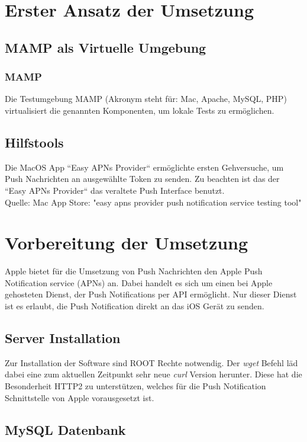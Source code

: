 \newpage


\section{Erster Ansatz der Umsetzung}

\subsection{MAMP als Virtuelle Umgebung}

\subsubsection{MAMP}
Die Testumgebung MAMP (Akronym steht für: Mac, Apache, MySQL, PHP) virtualisiert die genannten Komponenten, um lokale Tests zu ermöglichen.

\subsection{Hilfstools}
Die MacOS App ``Easy APNs Provider`` ermöglichte ersten Gehversuche, um Push Nachrichten an ausgewählte Token zu senden.
Zu beachten ist das der ``Easy APNs Provider`` das veraltete Push Interface benutzt. 
\\
Quelle: Mac App Store: "easy apns provider push
 notification service testing tool"

\section{Vorbereitung der Umsetzung}
Apple bietet für die Umsetzung von Push Nachrichten den Apple Push Notification service (APNs) an. Dabei handelt es sich um einen bei Apple gehosteten Dienst, der Push Notifications per API ermöglicht. Nur dieser Dienst ist es erlaubt, die Push Notification direkt an das iOS Gerät zu senden.


\subsection{Server Installation}
Zur Installation der Software sind ROOT Rechte notwendig. Der \textit{wget} Befehl läd dabei eine zum aktuellen Zeitpunkt sehr neue \textit{curl} Version herunter. Diese hat die Besonderheit HTTP2 zu unterstützen, welches für die Push Notification Schnittstelle von Apple vorausgesetzt ist.

\newpage

\subsection{MySQL Datenbank}


